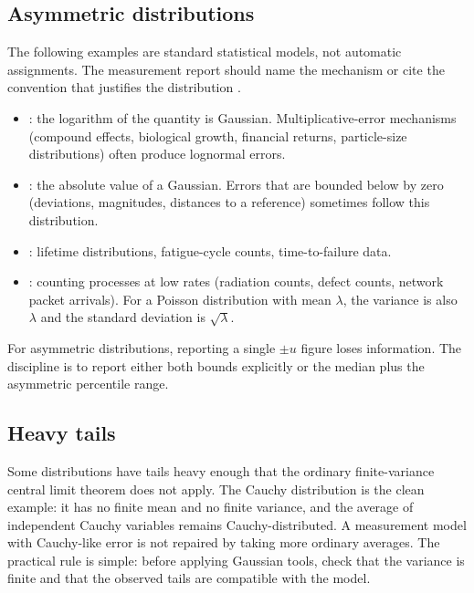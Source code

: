 \subsection{Asymmetric distributions}

The following examples are standard statistical models, not automatic
assignments. The measurement report should name the mechanism or
cite the convention that justifies the distribution
\cite{text:taylor1997}.

\begin{itemize}[leftmargin=*]
  \item {}: the logarithm of the quantity is
    Gaussian. Multiplicative-error mechanisms (compound effects,
    biological growth, financial returns, particle-size
    distributions) often produce lognormal errors.
  \item {}: the absolute value of a Gaussian.
    Errors that are bounded below by zero (deviations, magnitudes,
    distances to a reference) sometimes follow this distribution.
  \item {}: lifetime distributions, fatigue-cycle
    counts, time-to-failure data.
  \item {}: counting processes at low rates (radiation
    counts, defect counts, network packet arrivals). For a Poisson
    distribution with mean $\lambda$, the variance is also
    $\lambda$ and the standard deviation is $\sqrt{\lambda}$.
\end{itemize}

For asymmetric distributions, reporting a single $\pm u$ figure
loses information. The discipline is to report either both bounds
explicitly or the median plus the asymmetric percentile range.

\subsection{Heavy tails}

Some distributions have tails heavy enough that the ordinary
finite-variance central limit theorem does not apply. The Cauchy
distribution is the clean example: it has no finite mean and no
finite variance, and the average of independent Cauchy variables
remains Cauchy-distributed. A measurement model with Cauchy-like
error is not repaired by taking more ordinary averages. The
practical rule is simple: before applying Gaussian tools, check that
the variance is finite and that the observed tails are compatible
with the model.

